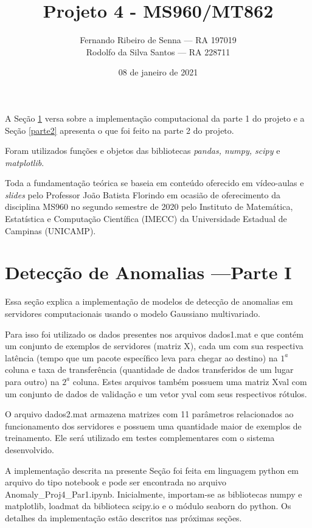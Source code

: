\documentclass[12pt]{article}
\title{Projeto 4 - MS960/MT862}
\author{Fernando Ribeiro de Senna --- RA 197019\\
Rodolfo da Silva Santos --- RA 228711}
\date{08 de janeiro de 2021}
\begin{document}
\maketitle

A Seção \ref{parte1} versa sobre a implementação computacional da parte 1 do projeto e a Seção \ref{parte2} apresenta o que foi feito na parte 2 do projeto.

Foram utilizados funções e objetos das bibliotecas \textit{pandas, numpy, scipy} e \textit{matplotlib}. 

Toda a fundamentação teórica se baseia em conteúdo oferecido em vídeo-aulas e \textit{slides} pelo Professor João Batista Florindo em ocasião de oferecimento da disciplina MS960 no segundo semestre de 2020 pelo Instituto de Matemática, Estatística e Computação Científica (IMECC) da Universidade Estadual de Campinas (UNICAMP).




\section{Detecção de Anomalias ---Parte I} \label{parte1}

Essa seção explica a implementação de modelos de detecção de anomalias em servidores computacionais usando o modelo Gaussiano multivariado.

Para isso foi utilizado os dados presentes nos arquivos dados1.mat e que contém um conjunto de exemplos de servidores (matriz X), cada um com sua respectiva latência (tempo que um pacote específico leva para chegar ao destino) na $1^{a}$ coluna e taxa de transferência (quantidade de dados transferidos de um lugar para outro) na $2^{a}$ coluna. Estes arquivos também possuem uma matriz Xval com um conjunto de dados de validação e um vetor yval com seus respectivos rótulos.

O arquivo dados2.mat armazena matrizes com 11 parâmetros relacionados ao funcionamento dos servidores e possuem uma quantidade maior de exemplos de treinamento. Ele será utilizado em testes complementares com o sistema desenvolvido.

A implementação descrita na presente Seção foi feita em linguagem python em arquivo do tipo notebook e pode ser encontrada no arquivo Anomaly\_Proj4\_Par1.ipynb. Inicialmente, importam-se as bibliotecas numpy e matplotlib, loadmat da biblioteca scipy.io e o módulo seaborn do python. Os detalhes da implementação estão descritos nas próximas seções.
\end{document}
